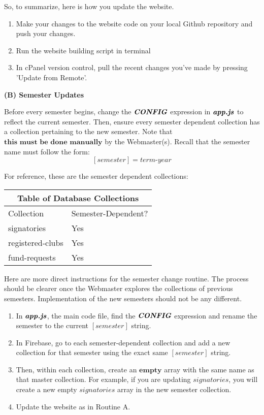 \documentclass[a4paper]{article}
\begin{document}
So, to summarize, here is how you update the website.

\begin{enumerate}
  \item Make your changes to the website code on your local Github repository and push your changes.
  \item Run the website building script in terminal
  \item In cPanel version control, pull the recent changes you've made by pressing 'Update from Remote'.
\end{enumerate}


\begin{center}
\textbf{(B) Semester Updates}
\end{center}

Before every semester begins, change the $\textbf{\textit{CONFIG}}$ expression in $\textbf{\textit{app.js}}$ to reflect the current semester. Then, ensure every semester dependent collection has a collection pertaining to the new semester. Note that $\textbf{this must be done manually}$ by the Webmaster(s). Recall that the semester name must follow the form:
$$[semester] = \textit{term-year}$$

For reference, these are the semester dependent collections:

\begin{center}
\begin{tabular}{ |p{4cm}||p{4cm}|  }
 \hline
 \multicolumn{2}{|c|}{Table of Database Collections} \\
 \hline
 Collection & Semester-Dependent? \\
 \hline
 signatories & Yes \\
 registered-clubs & Yes \\
 fund-requests & Yes \\
 \hline
\end{tabular}
\end{center}

Here are more direct instructions for the semester change routine. The process should be clearer once the Webmaster explores the collections of previous semesters. Implementation of the new semesters should not be any different.

\begin{enumerate}
  \item In $\textbf{\textit{app.js}}$, the main code file, find the $\textbf{\textit{CONFIG}}$ expression and rename the semester to the current $[semester]$ string.
  \item In Firebase, go to each semester-dependent collection and add a new collection for that semester using the exact same $[semester]$ string.
  \item Then, within each collection, create an $\textbf{empty}$ array with the same name as that master collection. For example, if you are updating $signatories$, you will create a new empty $signatories$ array in the new semester collection.
  \item Update the website as in Routine A.
\end{enumerate}
\end{document}
